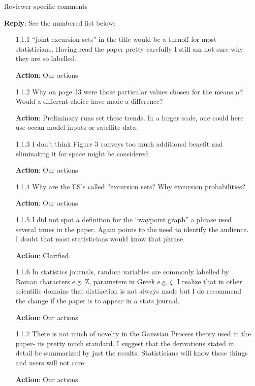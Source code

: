 \documentclass[a4paper]{article}
\def\reply{\textbf{Reply}}
\def\action{\textbf{Action}}
\begin{document}
\begin{answers}
\item{Reviewer specific comments}\label{q11}

\reply: See the numbered list below:
\begin{itemize}[noitemsep,topsep=0pt,parsep=0pt,partopsep=0pt]

\item[1.1.1] “joint excursion sets” in the title would be a turnoff for most statisticians. Having read the paper pretty carefully I still am not sure why they are so labelled.\par
\action: Our actions
\vspace{1em}

\item[1.1.2] Why on page 13 were those particular values chosen for the means $\mu$? Would a different choice have made a difference?\par
\action: Preliminary runs set these trends. In a larger scale, one could here use ocean model inputs or satellite data. 

\vspace{1em}

\item[1.1.3] I don’t think Figure 3 conveys too much additional benefit and eliminating it for space might be considered.\par
\action: Our actions
\vspace{1em}

\item[1.1.4] Why are the ES’s called ”excursion sets? Why excursion probabilities?\par
\action: Our actions
\vspace{1em}

\item[1.1.5] I did not spot a definition for the “waypoint graph” a phrase used several times in the paper. Again points to the need to identify the audience. I doubt that most statisticians would know that phrase.\par
\action: Clarified. 
\vspace{1em}

\item[1.1.6] In statistics journals, random variables are commonly labelled by Roman characters e.g. Z, parameters in Greek e.g. $\xi$. I realize that in other scientific domains that distinction is not always made but I do recommend the change if the paper is to appear in a stats journal.\par 
\action: Our actions
\vspace{1em}

\item[1.1.7] There is not much of novelty in the Gaussian Process theory used in the paper- its pretty much standard. I suggest that the derivations stated in detail be summarized by just the results. Statisticians will know these things and users will not care.\par
\action: Our actions
\vspace{1em}

\end{itemize}

\end{answers}
\end{document}
